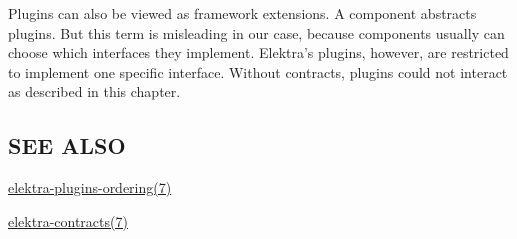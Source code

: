 Plugins can also be viewed as framework extensions. A component abstracts plugins. But this term is misleading in our case, because components usually can choose which interfaces they implement. Elektra's plugins, however, are restricted to implement one specific interface. Without contracts, plugins could not interact as described in this chapter.

\subsection*{S\+E\+E A\+L\+S\+O}


\begin{DoxyItemize}
\item \hyperlink{md_doc_help_elektra-plugins-ordering_doc_help_elektra-plugins-ordering_md}{elektra-\/plugins-\/ordering(7)}
\item \hyperlink{md_doc_help_elektra-contracts_doc_help_elektra-contracts_md}{elektra-\/contracts(7)} 
\end{DoxyItemize}